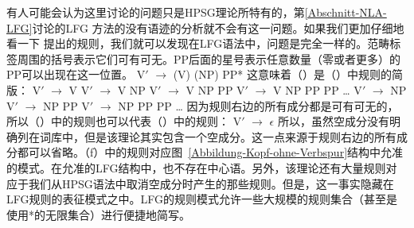 有人可能会认为这里讨论的问题只是HPSG\indexlfgstartc 理论所特有的，第\ref{Abschnitt-NLA-LFG}讨论的LFG
方法的没有语迹的分析就不会有这一问题。如果我们更加仔细地看一下 \citet[]{Dalrymple2006a}提出的规则，我们就可以发现在LFG语法中，问题是完全一样的。范畴标签周围的括号表示它们可有可无。PP后面的星号表示任意数量（零或者更多）的PP可以出现在这一位置。
\ea
V$'$ $\to$ (V) (NP) PP*
\z
这意味着（）是（）中规则的简版：
\eal
\ex V$'$ $\to$ V
\ex V$'$ $\to$ V NP
\ex V$'$ $\to$ V NP PP
\ex V$'$ $\to$ V NP PP PP
\ex \ldots
\ex V$'$ $\to$ NP
\ex V$'$ $\to$ NP PP
\ex V$'$ $\to$ NP PP PP
\ex \ldots
\zl
因为规则右边的所有成分都是可有可无的，所以（）中的规则也可以代表（）中的规则：
\ea
V$'$ $\to$ $\epsilon$
\z
所以，虽然空成分没有明确列在词库中，但是该理论其实包含一个空成分。这一点来源于规则右边的所有成分都可以省略。（f）中的规则对应图~\ref{Abbildung-Kopf-ohne-Verbspur}结构中允准的模式。在允准的LFG结构中，也不存在中心语。另外，该理论还有大量规则对应于我们从HPSG语法中取消空成分时产生的那些规则。但是，这一事实隐藏在LFG规则的表征模式之中。LFG的规则模式允许一些大规模的规则集合（甚至是使用*的无限集合）进行便捷地简写\indexlfgendc。

